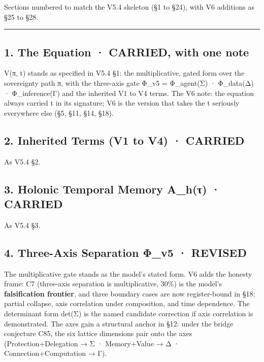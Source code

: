 \documentclass[
  11pt,
]{article}
\begin{document}
Sections numbered to match the V5.4 skeleton (§1 to §24), with V6
additions as §25 to §28.

\begin{center}\rule{0.5\linewidth}{0.5pt}\end{center}

\subsection{1. The Equation · CARRIED, with one
note}\label{the-equation-carried-with-one-note}

V(π, t) stands as specified in V5.4 §1: the multiplicative, gated form
over the sovereignty path π, with the three-axis gate Φ\_v5 =
Φ\_agent(Σ) · Φ\_data(Δ) · Φ\_inference(Γ) and the inherited V1 to V4
terms. The V6 note: the equation always carried t in its signature; V6
is the version that takes the t seriously everywhere else (§5, §11, §14,
§18).

\subsection{2. Inherited Terms (V1 to V4) ·
CARRIED}\label{inherited-terms-v1-to-v4-carried}

As V5.4 §2.

\subsection{3. Holonic Temporal Memory A\_h(τ) ·
CARRIED}\label{holonic-temporal-memory-a_hux3c4-carried}

As V5.4 §3.

\subsection{4. Three-Axis Separation Φ\_v5 ·
REVISED}\label{three-axis-separation-ux3c6_v5-revised}

The multiplicative gate stands as the model's stated form. V6 adds the
honesty frame: C7 (three-axis separation is multiplicative, 30\%) is the
model's \textbf{falsification frontier}, and three boundary cases are
now register-bound in §18: partial collapse, axis correlation under
composition, and time dependence. The determinant form det(Σ) is the
named candidate correction if axis correlation is demonstrated. The axes
gain a structural anchor in §12: under the bridge conjecture C85, the
six lattice dimensions pair onto the axes (Protection+Delegation → Σ ·
Memory+Value → Δ · Connection+Computation → Γ).
\end{document}
